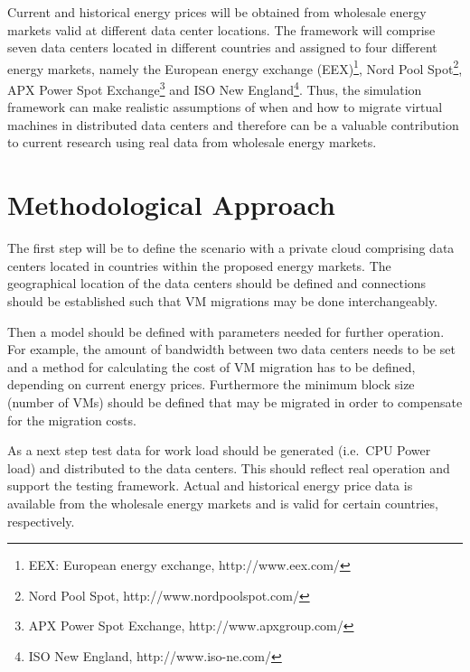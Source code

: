 \documentclass[a4paper]{article}
\begin{document}
Current and historical energy prices will be obtained from wholesale energy markets valid at different data center locations. The framework will comprise seven data centers located in different countries and assigned to four different energy markets, namely the 
European energy exchange (EEX)\footnote{EEX: European energy exchange, http://www.eex.com/}, Nord Pool Spot\footnote{Nord Pool Spot, http://www.nordpoolspot.com/}, APX Power Spot Exchange\footnote{APX Power Spot Exchange, http://www.apxgroup.com/} and ISO New England\footnote{ISO New England, http://www.iso-ne.com/}. Thus, the simulation framework can make realistic assumptions of when and how to migrate virtual machines in distributed data centers and therefore can be a valuable contribution to current research using real data from wholesale energy markets. 


\section{Methodological Approach}

The first step will be to define the scenario with a private cloud comprising data centers located in countries within the proposed energy markets. The geographical location of the data centers should be defined and connections should be established such that VM migrations may be done interchangeably. 

Then a model should be defined with parameters needed for further operation. For example, the amount of bandwidth between two data centers needs to be set and a method for calculating the cost of VM migration has to be defined, depending on current energy prices. Furthermore the minimum block size (number of VMs) should be defined that may be migrated in order to compensate for the migration costs.

As a next step test data for work load should be generated (i.e.\ CPU Power load) and distributed to the data centers. This should reflect real operation and support the testing framework. Actual and historical energy price data is available from the wholesale energy markets and is valid for certain countries, respectively. 

\end{document}
